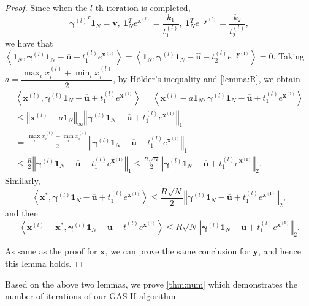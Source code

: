 \documentclass[review,hidelinks,onefignum,onetabnum]{siamart220329}
\begin{document}
\begin{proof}
Since when the $l$-th iteration is completed, 
$$ \bm{\gamma}^{(l)^{T}} \bm{1}_N=\bm{v}, \ \bm{1}_N^{T}e^{\bm{x}^{(l)}}=\frac{k_1}{t_1^{(l)}}, \ \bm{1}_N^{T}e^{-\bm{y}^{(l)}}=\frac{k_2}{t_2^{(l)}},$$ 
we have that $\left\langle \bm{1}_N, \bm{\gamma}^{(l)}\bm{1}_N-\bm{\overline{u}}+t_1^{(l)} e^{\bm{x^{(l)}}} \right\rangle = \left\langle \bm{1}_N, \bm{\gamma}^{(l)}\bm{1}_N-\bm{\hat{u}}-t_2^{(l)} e^{\bm{-y^{(l)}}} \right\rangle=0$. 
Taking $a=\dfrac{\max_i x_i^{(l)}+\min_i x_i^{(l)}}{2}$, by H{\"o}lder's inequality and \cref{lemma:R}, we obtain
\begin{multline*}
         \left\langle \bm{x}^{(l)}, \bm{\gamma}^{(l)}\bm{1}_N-\bm{\overline{u}}+t_1^{(l)}e^{\bm{x^{(l)}}} \right\rangle= \left\langle \bm{x}^{(l)} -a\bm{1}_N, \bm{\gamma}^{(l)}\bm{1}_N-\bm{\overline{u}}+t_1^{(l)}e^{\bm{x^{(l)}}} \right\rangle \\
    \leq \left\Vert \bm{x}^{(l)} -a\bm{1}_N \right\Vert_{\infty} \left\Vert \bm{\gamma}^{(l)}\bm{1}_N-\bm{\overline{u}}+t_1^{(l)}e^{\bm{x^{(l)}}} \right\Vert_1 \\
    = \frac{\max_i x_i^{(l)}-\min_i x_i^{(l)}}{2} \left\Vert \bm{\gamma}^{(l)}\bm{1}_N-\bm{\overline{u}}+t_1^{(l)}e^{\bm{x^{(l)}}} \right\Vert_1 \\
    \leq \frac{R}{2} \left\Vert \bm{\gamma}^{(l)}\bm{1}_N-\bm{\overline{u}}+t_1^{(l)}e^{\bm{x^{(l)}}} \right\Vert_1
    \leq  \frac{R\sqrt{N}}{2} \left\Vert \bm{\gamma}^{(l)}\bm{1}_N-\bm{\overline{u}}+t_1^{(l)}e^{\bm{x^{(l)}}} \right\Vert_2.  
\end{multline*}
Similarly, 
$$\left\langle \bm{x}^{*}, \bm{\gamma}^{(l)}\bm{1}_N-\bm{\overline{u}}+t_1^{(l)}e^{\bm{x^{(l)}}} \right\rangle\leq \frac{R\sqrt{N}}{2} \left\Vert \bm{\gamma}^{(l)}\bm{1}_N-\bm{\overline{u}}+t_1^{(l)}e^{\bm{x^{(l)}}} \right\Vert_2, $$
and then
$$\left\langle \bm{x}^{(l)}-\bm{x}^{*}, \bm{\gamma}^{(l)}\bm{1}_N-\bm{\overline{u}}+t_1^{(l)}e^{\bm{x^{(l)}}} \right\rangle \leq R\sqrt{N} \left\Vert \bm{\gamma}^{(l)}\bm{1}_N-\bm{\overline{u}}+t_1^{(l)}e^{\bm{x^{(l)}}} \right\Vert_2. $$

As same as the proof for $\bm{x}$, we can prove the same conclusion for $\bm{y}$, and hence this lemma holds. 
\quad
\end{proof}

Based on the above two lemmas, we prove \cref{thm:num} which demonstrates the number of iterations of our GAS-II algorithm. 
\end{document}
